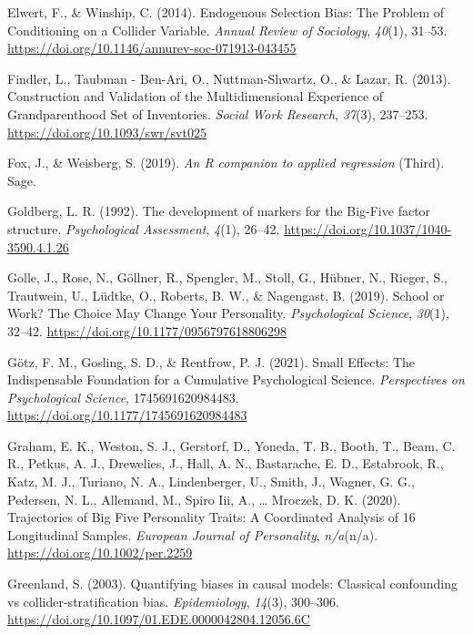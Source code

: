 \documentclass[
  english,
  man, noextraspace]{apa7}
\begin{document}
\leavevmode\hypertarget{ref-elwertEndogenousSelectionBias2014}{}%
Elwert, F., \& Winship, C. (2014). Endogenous Selection Bias: The Problem of Conditioning on a Collider Variable. \emph{Annual Review of Sociology}, \emph{40}(1), 31--53. \url{https://doi.org/10.1146/annurev-soc-071913-043455}

\leavevmode\hypertarget{ref-findlerConstructionValidationMultidimensional2013}{}%
Findler, L., Taubman - Ben-Ari, O., Nuttman-Shwartz, O., \& Lazar, R. (2013). Construction and Validation of the Multidimensional Experience of Grandparenthood Set of Inventories. \emph{Social Work Research}, \emph{37}(3), 237--253. \url{https://doi.org/10.1093/swr/svt025}

\leavevmode\hypertarget{ref-car2019}{}%
Fox, J., \& Weisberg, S. (2019). \emph{An R companion to applied regression} (Third). Sage.

\leavevmode\hypertarget{ref-goldbergDevelopmentMarkersBigFive1992}{}%
Goldberg, L. R. (1992). The development of markers for the Big-Five factor structure. \emph{Psychological Assessment}, \emph{4}(1), 26--42. \url{https://doi.org/10.1037/1040-3590.4.1.26}

\leavevmode\hypertarget{ref-golleSchoolWorkChoice2019}{}%
Golle, J., Rose, N., Göllner, R., Spengler, M., Stoll, G., Hübner, N., Rieger, S., Trautwein, U., Lüdtke, O., Roberts, B. W., \& Nagengast, B. (2019). School or Work? The Choice May Change Your Personality. \emph{Psychological Science}, \emph{30}(1), 32--42. \url{https://doi.org/10.1177/0956797618806298}

\leavevmode\hypertarget{ref-gotzSmallEffectsIndispensable2021}{}%
Götz, F. M., Gosling, S. D., \& Rentfrow, P. J. (2021). Small Effects: The Indispensable Foundation for a Cumulative Psychological Science. \emph{Perspectives on Psychological Science}, 1745691620984483. \url{https://doi.org/10.1177/1745691620984483}

\leavevmode\hypertarget{ref-grahamTrajectoriesBigFive2020}{}%
Graham, E. K., Weston, S. J., Gerstorf, D., Yoneda, T. B., Booth, T., Beam, C. R., Petkus, A. J., Drewelies, J., Hall, A. N., Bastarache, E. D., Estabrook, R., Katz, M. J., Turiano, N. A., Lindenberger, U., Smith, J., Wagner, G. G., Pedersen, N. L., Allemand, M., Spiro Iii, A., \ldots{} Mroczek, D. K. (2020). Trajectories of Big Five Personality Traits: A Coordinated Analysis of 16 Longitudinal Samples. \emph{European Journal of Personality}, \emph{n/a}(n/a). \url{https://doi.org/10.1002/per.2259}

\leavevmode\hypertarget{ref-greenlandQuantifyingBiasesCausal2003}{}%
Greenland, S. (2003). Quantifying biases in causal models: Classical confounding vs collider-stratification bias. \emph{Epidemiology}, \emph{14}(3), 300--306. \url{https://doi.org/10.1097/01.EDE.0000042804.12056.6C}
\end{document}

